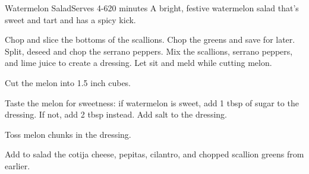 \documentclass[11pt]{article}
\begin{document}
    \begin{recipe}{Watermelon Salad}{Serves 4-6}{20 minutes}
    \freeform A bright, festive watermelon salad that's sweet and tart and has a spicy kick.


    Chop and slice the bottoms of the scallions. Chop the greens and save for later. Split, deseed and chop the serrano peppers. Mix the scallions, serrano peppers, and lime juice to create a dressing. Let sit and meld while cutting melon.


    Cut the melon into 1.5 inch cubes.


    Taste the melon for sweetness: if watermelon is sweet, add 1 tbsp of sugar to the dressing. If not, add 2 tbsp instead. Add salt to the dressing.

    \newstep
    Toss melon chunks in the dressing.


    Add to salad the cotija cheese, pepitas, cilantro, and chopped scallion greens from earlier.

    \freeform\hrulefill
    \end{recipe}
\end{document}
